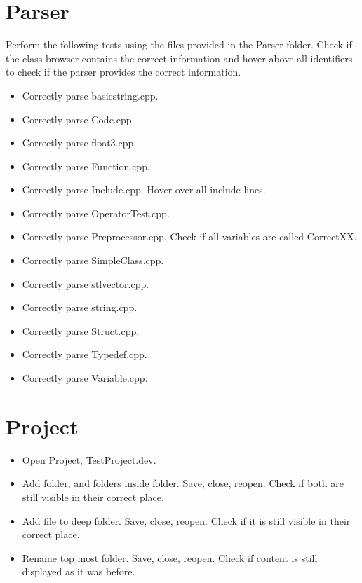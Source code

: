 \documentclass{article}
\begin{document}
\clearpage
\section{Parser}
Perform the following tests using the files provided in the Parser folder. Check if the class browser contains the correct information and hover above all identifiers to check if the parser provides the correct information.
\begin{itemize}
    \item Correctly parse basic\textunderscore string.cpp.
    \item Correctly parse Code.cpp.
    \item Correctly parse float3.cpp.
    \item Correctly parse Function.cpp.
    \item Correctly parse Include.cpp. Hover over all include lines.
    \item Correctly parse OperatorTest.cpp.
    \item Correctly parse Preprocessor.cpp. Check if all variables are called CorrectXX.
    \item Correctly parse SimpleClass.cpp.
    \item Correctly parse stl\textunderscore vector.cpp.
    \item Correctly parse string.cpp.
    \item Correctly parse Struct.cpp.
    \item Correctly parse Typedef.cpp.
    \item Correctly parse Variable.cpp.
\end{itemize}

\clearpage
\section{Project}
\begin{itemize}
    \item Open Project, TestProject.dev.
    \item Add folder, and folders inside folder. Save, close, reopen. Check if both are still visible in their correct place.
    \item Add file to deep folder.  Save, close, reopen. Check if it is still visible in their correct place.
    \item Rename top most folder. Save, close, reopen. Check if content is still displayed as it was before.
\end{itemize}

\clearpage
\end{document}

